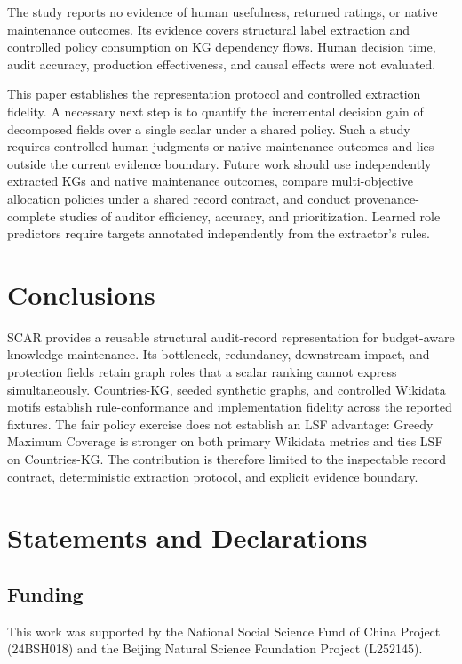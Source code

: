 \documentclass[pdflatex,sn-basic]{sn-jnl}
\begin{document}
The study reports no evidence of human usefulness, returned ratings, or native maintenance outcomes. Its evidence covers structural label extraction and controlled policy consumption on KG dependency flows. Human decision time, audit accuracy, production effectiveness, and causal effects were not evaluated.

This paper establishes the representation protocol and controlled extraction fidelity. A necessary next step is to quantify the incremental decision gain of decomposed fields over a single scalar under a shared policy. Such a study requires controlled human judgments or native maintenance outcomes and lies outside the current evidence boundary. Future work should use independently extracted KGs and native maintenance outcomes, compare multi-objective allocation policies under a shared record contract, and conduct provenance-complete studies of auditor efficiency, accuracy, and prioritization. Learned role predictors require targets annotated independently from the extractor's rules.

\section{Conclusions}
\label{sec:conclusions}

SCAR provides a reusable structural audit-record representation for budget-aware knowledge maintenance. Its bottleneck, redundancy, downstream-impact, and protection fields retain graph roles that a scalar ranking cannot express simultaneously. Countries-KG, seeded synthetic graphs, and controlled Wikidata motifs establish rule-conformance and implementation fidelity across the reported fixtures. The fair policy exercise does not establish an LSF advantage: Greedy Maximum Coverage is stronger on both primary Wikidata metrics and ties LSF on Countries-KG. The contribution is therefore limited to the inspectable record contract, deterministic extraction protocol, and explicit evidence boundary.

\section*{Statements and Declarations}

\subsection*{Funding}
This work was supported by the National Social Science Fund of China Project (24BSH018) and the Beijing Natural Science Foundation Project (L252145).
\end{document}
